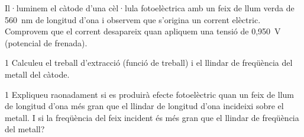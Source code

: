Il·luminem el càtode d'una cèl·lula fotoelèctrica amb un feix de llum verda de 560~nm de longitud d'ona i observem que s'origina un corrent elèctric. Comprovem que el corrent desapareix quan apliquem una tensió de 0,950~V (potencial de frenada).

\begin{apartat}{1}
Calculeu el treball d'extracció (funció de treball) i el llindar de freqüència del metall del càtode.
\end{apartat}

\begin{apartat}{1}
Expliqueu raonadament si es produirà efecte fotoelèctric quan un feix de llum de longitud d'ona més gran que el llindar de longitud d'ona incideixi sobre el metall. I si la freqüència del feix incident és més gran que el llindar de freqüència del metall?
\end{apartat}

